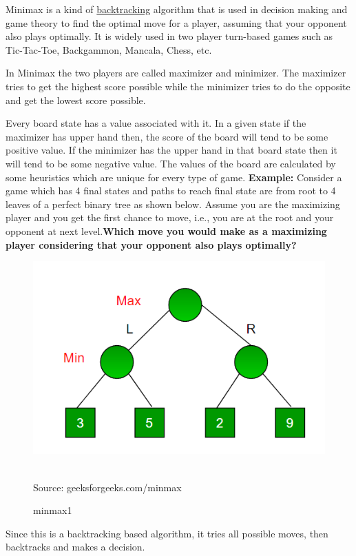 Minimax is a kind of
\href{https://en.wikipedia.org/wiki/Backtracking}{backtracking}
algorithm that is used in decision making and game theory to find the optimal move for a player, assuming that your opponent also plays optimally. It is widely used in two player turn-based games such as Tic-Tac-Toe, Backgammon, Mancala, Chess, etc.

In Minimax the two players are called maximizer and minimizer. The maximizer tries to get the highest score possible while the minimizer tries to do the opposite and get the lowest score possible.

Every board state has a value associated with it. In a given state if the maximizer has upper hand then, the score of the board will tend to be some positive value. If the minimizer has the upper hand in that board state then it will tend to be some negative value. The values of the board are calculated by some heuristics which are unique for every type of game.
\newpage
\textbf{Example: }
Consider a game which has 4 final states and paths to reach final state are from root to 4 leaves of a perfect binary tree as shown below. Assume you are the maximizing player and you get the first chance to move, i.e., you are at the root and your opponent at next level.\textbf{Which move you would make as a maximizing player considering that your opponent also plays optimally?}
\begin{figure}
    \centering
    \includegraphics[]{minmax.png}
    \caption{minmax1}\\
    Source: geeksforgeeks.com/minmax
    \label{game4}
\end{figure}
Since this is a backtracking based algorithm, it tries all possible moves, then backtracks and makes a decision.
